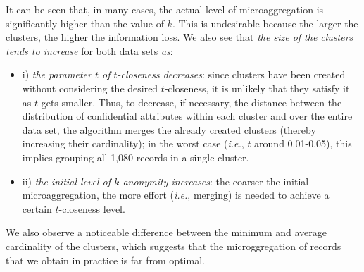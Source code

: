 \documentclass[10pt,journal,compsoc]{IEEEtran}
\theoremstyle{definition}
\theoremstyle{plain}
\begin{document}
It can be seen that, in many cases, the actual level of microaggregation
is significantly higher than the value of $k$. This is undesirable because 
the larger the clusters, the higher the information loss. 
We also see that {\em the size of the clusters tends to increase} for both data sets {\em as}:
\begin {itemize}
\item i) {\em the parameter $t$ of  $t$-closeness decreases}: since clusters have been created without
considering the desired $t$-closeness, it is unlikely that 
they satisfy it as $t$ gets smaller. 
Thus, to decrease, if necessary, the distance between
the distribution of confidential attributes within each cluster and 
over the entire data set,
the algorithm merges the already created clusters (thereby 
increasing their cardinality);
in the worst case ({\em i.e.}, $t$ around 0.01-0.05), this implies grouping all 1,080 records in a single cluster.  
\item ii) {\em the initial level of $k$-anonymity increases}: the coarser the initial microaggregation,  
the more effort ({\em i.e.}, merging) is needed to achieve a certain $t$-closeness level. 
\end {itemize}

We also observe a noticeable difference between the minimum and average cardinality of the
clusters, which suggests that the microggregation of records that we obtain in practice
is far from optimal.
\end{document}
